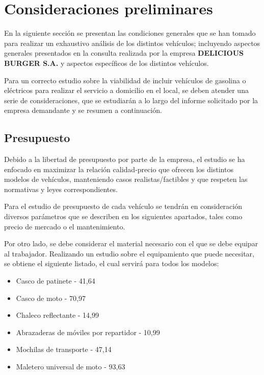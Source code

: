 \newpage
\section{Consideraciones preliminares}
\label{consideraciones_preliminares}

En la siguiente sección se presentan las condiciones generales que se han tomado para realizar un exhaustivo análisis de los distintos vehículos; incluyendo aspectos generales presentados en la consulta realizada por la empresa \textbf{DELICIOUS BURGER S.A.} y aspectos específicos de los distintos vehículos.

Para un correcto estudio sobre la viabilidad de incluir vehículos de gasolina o eléctricos para realizar el servicio a domicilio en el local, se deben atender una serie de consideraciones, que se estudiarán a lo largo del informe solicitado por la empresa demandante y se resumen a continuación.

\subsection{Presupuesto}
\label{consideraciones_preliminares_presupuesto}

Debido a la libertad de presupuesto por parte de la empresa, el estudio se ha enfocado en maximizar la relación calidad-precio que ofrecen los distintos modelos de vehículos, manteniendo casos realistas/factibles y que respeten las normativas y leyes correspondientes.

Para el estudio de presupuesto de cada vehículo se tendrán en consideración diversos parámetros que se describen en los siguientes apartados, tales como precio de mercado o el mantenimiento.

Por otro lado, se debe considerar el material necesario con el que se debe equipar al trabajador. Realizando un estudio sobre el equipamiento que puede necesitar, se obtiene el siguiente listado, el cual servirá para todos los modelos:

\begin{itemize}
    \item Casco de patinete \cite{cascopatineteamazon} - 41,64 
    \item Casco de moto \cite{cascomototeamazon} - 70,97 
    \item Chaleco reflectante \cite{chalecoamazon} - 14,99 
    \item Abrazaderas de móviles por repartidor \cite{abrazaderaamazon} - 10,99 
    \item Mochilas de transporte \cite{mochilaamazon} - 47,14 
    \item Maletero universal de moto \cite{maletero} - 93,63 
\end{itemize}

